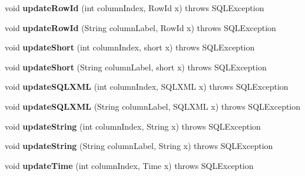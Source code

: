 \begin{DoxyCompactItemize}
void {\bfseries update\+Row\+Id} (int column\+Index, Row\+Id x)  throws S\+Q\+L\+Exception 
\item 
\mbox{\label{classsimpledb_1_1jdbc_1_1ResultSetAdapter_a4d498540a5e35accdfd6bc12e16fa3c7}} 
void {\bfseries update\+Row\+Id} (String column\+Label, Row\+Id x)  throws S\+Q\+L\+Exception 
\item 
\mbox{\label{classsimpledb_1_1jdbc_1_1ResultSetAdapter_a3002feac76821df43e751419938eeb48}} 
void {\bfseries update\+Short} (int column\+Index, short x)  throws S\+Q\+L\+Exception 
\item 
\mbox{\label{classsimpledb_1_1jdbc_1_1ResultSetAdapter_a1dc06bcf30708cfb0e536826c4101a9d}} 
void {\bfseries update\+Short} (String column\+Label, short x)  throws S\+Q\+L\+Exception 
\item 
\mbox{\label{classsimpledb_1_1jdbc_1_1ResultSetAdapter_a4f56a4765bda1dd49769aed76d39f626}} 
void {\bfseries update\+S\+Q\+L\+X\+ML} (int column\+Index, S\+Q\+L\+X\+ML x)  throws S\+Q\+L\+Exception 
\item 
\mbox{\label{classsimpledb_1_1jdbc_1_1ResultSetAdapter_a5d06c6654e45d0d80b075e4eea3b0a44}} 
void {\bfseries update\+S\+Q\+L\+X\+ML} (String column\+Label, S\+Q\+L\+X\+ML x)  throws S\+Q\+L\+Exception 
\item 
\mbox{\label{classsimpledb_1_1jdbc_1_1ResultSetAdapter_a7d7a4e2c0faa5acb273e9930a91006fd}} 
void {\bfseries update\+String} (int column\+Index, String x)  throws S\+Q\+L\+Exception 
\item 
\mbox{\label{classsimpledb_1_1jdbc_1_1ResultSetAdapter_ac1aeb38752ff8071b979546f35a0c51f}} 
void {\bfseries update\+String} (String column\+Label, String x)  throws S\+Q\+L\+Exception 
\item 
\mbox{\label{classsimpledb_1_1jdbc_1_1ResultSetAdapter_ae08369a040f92e8ad83c6789a6b8cd0f}} 
void {\bfseries update\+Time} (int column\+Index, Time x)  throws S\+Q\+L\+Exception 

\end{DoxyCompactItemize}
